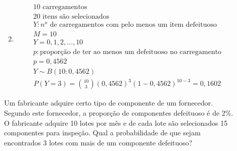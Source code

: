 \begin{description}
\begin{example}
\begin{enumerate}[label=(\alph*)]
\begin{align*}
            \end{align*}
          \item
            \begin{gather*}
              10\text{ carregamentos}\\
              20  \text{ itens são selecionados} \\
              Y: \text{$n^o$ de carregamentos com pelo menos um item defeituoso} \\
              M=10\\
              Y=0,1,2,\ldots,10\\
              p:\text{proporção de ter ao menos um defeituoso no carregamento}\\
              p=0,4562\\
              Y \sim B(10:0,4562)
            \end{gather*}
            \begin{align*}
              P(Y=3)=\binom{10}{3}(0,4562)^3 (1-0,4562)^{10-3}=0,1602
            \end{align*}
        \end{enumerate}
    \end{example}
    \begin{exercise}
      Um fabricante adquire certo tipo de componente de um fornecedor.
      Segundo este fornecedor, a proporção de componentes defeituoso é de 2\%. O fabricante
      adquire 10 lotes por mês e de cada lote são selecionados 15 componentes para 
      inspeção. Qual a probabilidade de que sejam encontrados 3 lotes com mais de um 
      componente defeituoso?
    \end{exercise}
  \end{description}
